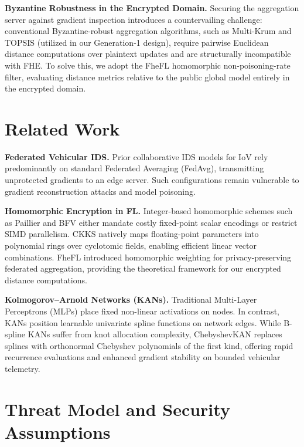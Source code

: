 \documentclass[conference]{IEEEtran}
\begin{document}
\textbf{Byzantine Robustness in the Encrypted Domain.}
Securing the aggregation server against gradient inspection introduces a
countervailing challenge: conventional Byzantine-robust aggregation algorithms,
such as Multi-Krum and TOPSIS (utilized in our Generation-1 design), require
pairwise Euclidean distance computations over plaintext updates and are
structurally incompatible with FHE. To solve this, we adopt the FheFL
homomorphic non-poisoning-rate filter, evaluating distance metrics relative
to the public global model entirely in the encrypted domain.

\section{Related Work}

\textbf{Federated Vehicular IDS.}
Prior collaborative IDS models for IoV rely predominantly on standard
Federated Averaging (FedAvg), transmitting unprotected gradients to an edge
server. Such configurations remain vulnerable to gradient reconstruction
attacks and model poisoning.

\textbf{Homomorphic Encryption in FL.}
Integer-based homomorphic schemes such as Paillier and BFV either mandate
costly fixed-point scalar encodings or restrict SIMD parallelism. CKKS natively
maps floating-point parameters into polynomial rings over cyclotomic fields,
enabling efficient linear vector combinations. FheFL introduced homomorphic
weighting for privacy-preserving federated aggregation, providing the
theoretical framework for our encrypted distance computations.

\textbf{Kolmogorov--Arnold Networks (KANs).}
Traditional Multi-Layer Perceptrons (MLPs) place fixed non-linear activations
on nodes. In contrast, KANs position learnable univariate spline functions
on network edges. While B-spline KANs suffer from knot allocation complexity,
ChebyshevKAN replaces splines with orthonormal Chebyshev polynomials of the
first kind, offering rapid recurrence evaluations and enhanced gradient
stability on bounded vehicular telemetry.

\section{Threat Model and Security Assumptions}
\end{document}
